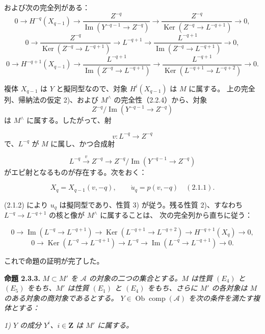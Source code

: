 \clearpage
{}%
\begingroup\small\setlength{\parskip}{0pt}\setlength{\emergencystretch}{1.5em}
\setlength{\abovedisplayskip}{4pt plus 2pt minus 2pt}%
\setlength{\belowdisplayskip}{4pt plus 2pt minus 2pt}%

および次の完全列がある：
\[
0\longrightarrow H^{-q}(X_{q-1})\longrightarrow
\frac{Z^{-q}}{\operatorname{Im}(Y^{-q-1}\longrightarrow Z^{-q})}
\longrightarrow
\frac{Z^{-q}}{\operatorname{Ker}(Z^{-q}\longrightarrow L^{-q+1})}
\longrightarrow0,
\]
\[
0\longrightarrow
\frac{Z^{-q}}{\operatorname{Ker}(Z^{-q}\longrightarrow L^{-q+1})}
\longrightarrow L^{-q+1}\longrightarrow
\frac{L^{-q+1}}{\operatorname{Im}(Z^{-q}\longrightarrow L^{-q+1})}
\longrightarrow0,
\]
\[
0\longrightarrow H^{-q+1}(X_{q-1})\longrightarrow
\frac{L^{-q+1}}{\operatorname{Im}(Z^{-q}\longrightarrow L^{-q+1})}
\longrightarrow
\frac{L^{-q+1}}{\operatorname{Ker}(L^{-q+1}\longrightarrow L^{-q+2})}
\longrightarrow0.
\]

複体 $X_{q-1}$ は $Y$ と擬同型なので、対象 $H^i(X_{q-1})$ は $M$ に属する。
上の完全列、帰納法の仮定 2)、および $M^\wedge$ の完全性（2.2.4）から、対象
\[
Z^{-q}/\operatorname{Im}(Y^{-q-1}\longrightarrow Z^{-q})
\]
は $M^\wedge$ に属する。したがって、射

\[
v\colon L^{-q}\longrightarrow Z^{-q}
\]
で、$L^{-q}$ が $M$ に属し、かつ合成射

\[
L^{-q}\xrightarrow{v}Z^{-q}\longrightarrow
Z^{-q}/\operatorname{Im}(Y^{-q-1}\longrightarrow Z^{-q})
\]
がエピ射となるものが存在する。次をおく：

\[
X_q=X_{q-1}(v,-q),
\qquad
\dot u_q=p(v,-q)\quad(2.1.1).
\]

(2.1.2) により $u_q$ は擬同型であり、性質 3) が従う。残る性質 2)、すなわち
$L^{-q}\longrightarrow L^{-q+1}$ の核と像が $M^\wedge$ に属することは、
次の完全列から直ちに従う：

\[
0\longrightarrow\operatorname{Im}(L^{-q}\longrightarrow L^{-q+1})
\longrightarrow\operatorname{Ker}(L^{-q+1}\longrightarrow L^{-q+2})
\longrightarrow H^{-q+1}(X_q)\longrightarrow0,
\]
\[
0\longrightarrow\operatorname{Ker}(L^{-q}\longrightarrow L^{-q+1})
\longrightarrow L^{-q}\longrightarrow
\operatorname{Im}(L^{-q}\longrightarrow L^{-q+1})\longrightarrow0.
\]

これで命題の証明が完了した。

\medskip\noindent\textbf{命題 2.3.3.}
\textit{$M\subset M'$ を $\mathcal A$ の対象の二つの集合とする。$M$ は性質
$(E_4)$ と $(E_5)$ をもち、$M'$ は性質 $(E_1)$ と $(E_4)$ をもち、さらに
$M'$ の各対象は $M$ のある対象の商対象であるとする。
$Y\in\operatorname{Ob}\operatorname{comp}(\mathcal A)$ を次の条件を満たす複体とする：}

\noindent\textit{1) $Y$ の成分 $Y^i$、$i\in\mathbf Z$ は $M'$ に属する。}
\endgroup
